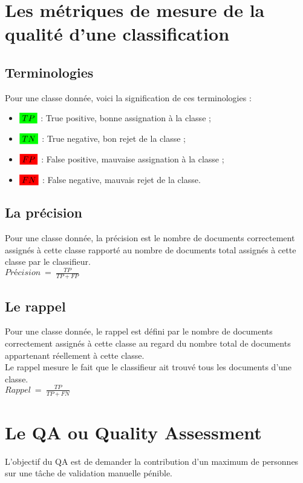 \section{Les métriques de mesure de la qualité d'une classification}
    \subsection{Terminologies}
        Pour une classe donnée, voici la signification de ces terminologies :
        \begin{itemize}
            \item $\highlight[green]{TP}$ : True positive, bonne assignation à la classe ;
            \item $\highlight[green]{TN}$ : True negative, bon rejet de la classe ;
            \item $\highlight[red]{FP}$ : False positive, mauvaise assignation à la classe ;
            \item $\highlight[red]{FN}$ : False negative, mauvais rejet de la classe.
        \end{itemize}

    \subsection{La précision}
    \label{annexe:precision}
        Pour une classe donnée, la précision est le nombre de documents correctement assignés à cette classe rapporté au nombre de documents total assignés à cette classe par le classifieur.\\
        $Précision\ =\ \frac{TP}{TP+FP}$


    \subsection{Le rappel}
    \label{annexe:rappel}
        Pour une classe donnée, le rappel est défini par le nombre de documents correctement assignés à cette classe au regard du nombre total de documents appartenant réellement à cette classe.\\
        Le rappel mesure le fait que le classifieur ait trouvé tous les documents d'une classe.\\
        $Rappel\ =\ \frac{TP}{TP+FN}$

\section{Le QA ou Quality Assessment}
\label{annexe:qa}
    L'objectif du QA est de demander la contribution d'un maximum de personnes sur une tâche de validation manuelle pénible.\\

